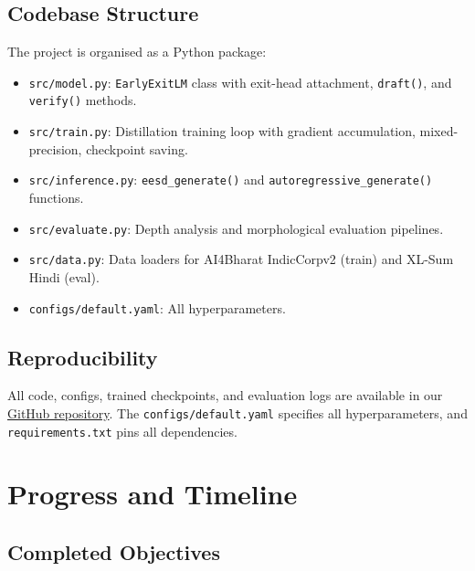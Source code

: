 \documentclass[11pt]{article}
\begin{document}
\subsection{Codebase Structure}

The project is organised as a Python package:

\begin{itemize}
    \item \texttt{src/model.py}: \texttt{EarlyExitLM} class with exit-head attachment, \texttt{draft()}, and \texttt{verify()} methods.
    \item \texttt{src/train.py}: Distillation training loop with gradient accumulation, mixed-precision, checkpoint saving.
    \item \texttt{src/inference.py}: \texttt{eesd\_generate()} and \texttt{autoregressive\_generate()} functions.
    \item \texttt{src/evaluate.py}: Depth analysis and morphological evaluation pipelines.
    \item \texttt{src/data.py}: Data loaders for AI4Bharat IndicCorpv2 (train) and XL-Sum Hindi (eval).
    \item \texttt{configs/default.yaml}: All hyperparameters.
\end{itemize}



\subsection{Reproducibility}

All code, configs, trained checkpoints, and evaluation logs are available in our \href{https://github.com/piyukr2/Speculative-Decoding-for-Hindi}{GitHub repository}.  The \texttt{configs/default.yaml} specifies all hyperparameters, and \texttt{requirements.txt} pins all dependencies.


\section{Progress and Timeline}
\label{sec:progress}

\subsection{Completed Objectives}
\end{document}
